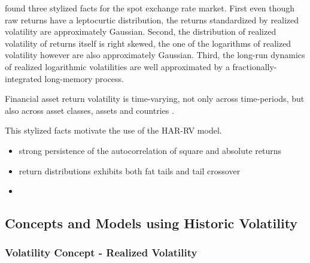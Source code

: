 \citeauthor{andersen2001} found three stylized facts for the spot exchange rate market. First even though raw returns have a leptocurtic distribution, the returns standardized by realized volatility are approximately Gaussian. Second, the distribution of realized volatility of returns itself is right skewed, the one of the logarithms of realized volatility however are also approximately Gaussian. Third, the long-run dynamics of realized logarithmic volatilities are well approximated by a fractionally-integrated long-memory process. 

Financial asset return volatility is time-varying,  not only across time-periods, but also across asset classes, assets and countries \parencite{andersen2001}.

This stylized facts motivate the use of the HAR-RV model.

\begin{itemize}
\item strong persistence of the autocorrelation of square and absolute returns \parencite{jiang2003}
\item return distributions exhibits both fat tails and tail crossover \parencite{jiang2003}
\item 
\end{itemize}



\subsection{Concepts and Models using Historic Volatility}
\subsubsection{Volatility Concept - Realized Volatility}


